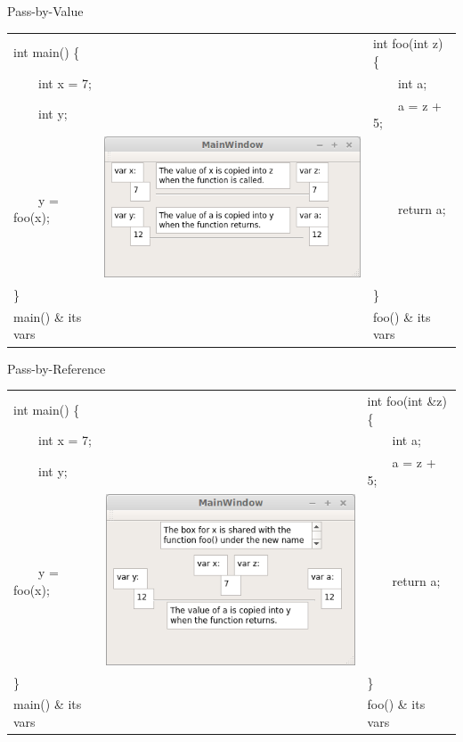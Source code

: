 \documentclass[presentation]{beamer}
\begin{document}
\begin{frame}[label=sec-7]{Pass-by-Value}
\begin{center}
\begin{tabular}{lll}
\hline
int main() \{ &  & int foo(int z) \{\\
\ \ \ \ int x = 7; &  & \ \ \ \ int a;\\
\ \ \ \ int y; &  & \ \ \ \ a = z + 5;\\
\ \ \ \ y = foo(x); & \includegraphics[width=.4\linewidth]{./myfunc.png} & \ \ \ \ return a;\\
\} &  & \}\\
\alert{main() \& its vars} &  & \alert{foo() \& its vars}\\
\hline
\end{tabular}
\end{center}
\end{frame}

\begin{frame}[label=sec-8]{Pass-by-Reference}
\begin{center}
\begin{tabular}{lll}
\hline
int main() \{ &  & int foo(int \&z) \{\\
\ \ \ \ int x = 7; &  & \ \ \ \ int a;\\
\ \ \ \ int y; &  & \ \ \ \ a = z + 5;\\
\ \ \ \ y = foo(x); & \includegraphics[width=.4\linewidth]{./reference.png} & \ \ \ \ return a;\\
\} &  & \}\\
\alert{main() \& its vars} &  & \alert{foo() \& its vars}\\
\hline
\end{tabular}
\end{center}
\end{frame}
\end{document}
